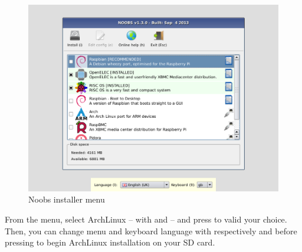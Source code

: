 \begin{figure}[h]
	\centering
	\includegraphics[scale=0.4]{images/NoobsMenu.png}
	\caption{Noobs installer menu}
	\label{figure:NoobsMenu}
\end{figure}

From the menu, select ArchLinux -- with \keys{\arrowkeyup} and 
\keys{\arrowkeydown} -- and press  to valid your choice. Then, you 
can change menu and keyboard language with respectively  and  
before pressing  to begin ArchLinux installation on your SD card.
